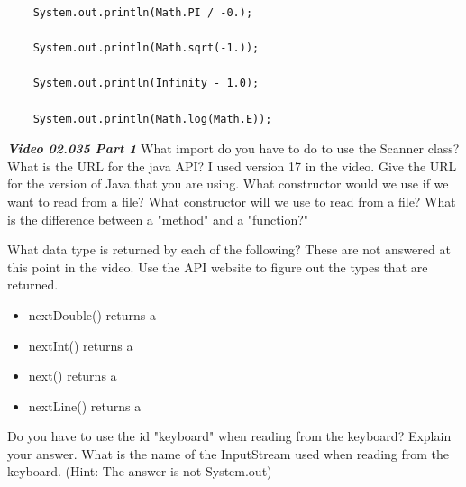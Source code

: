 \documentclass[letterpaper,11pt]{exam}
\newcommand{\videoheading}[1]{\Large\textbf{\textit{#1}}}
\begin{document}
\begin{questions}
\begin{samepage}
\begin{verbatim}
    System.out.println(Math.PI / -0.);
    
    System.out.println(Math.sqrt(-1.));
    
    System.out.println(Infinity - 1.0);

    System.out.println(Math.log(Math.E)); 
\end{verbatim}
\end{samepage}
\videoheading{Video 02.035 Part 1}
\question 
\question What import do you have to do to use the Scanner class?
\question What is the URL for the java API?  I used version 17 in the video.  Give the URL for the version of Java that you are using.
\question What constructor would we use if we want to read from a file?
\question What constructor will we use to read from a file?
\question What is the difference between a "method" and a "function?"
\begin{samepage}
\question What data type is returned by each of the following?  These are not answered at this point in the video.  Use the API website to figure out the types that are returned.
\begin{itemize}
  \item nextDouble() returns a \makebox[2in]{\hrulefill}
  \item nextInt() returns a \makebox[2in]{\hrulefill}
  \item next() returns a \makebox[2in]{\hrulefill}
  \item nextLine() returns a \makebox[2in]{\hrulefill}
\end{itemize}
\end{samepage}
\question Do you have to use the id "keyboard" when reading from the keyboard?  Explain your answer.
\vspace{1cm}
\question What is the name of the InputStream used when reading from the keyboard.  (Hint:  The answer is not System.out)


\end{questions}
\end{document}
